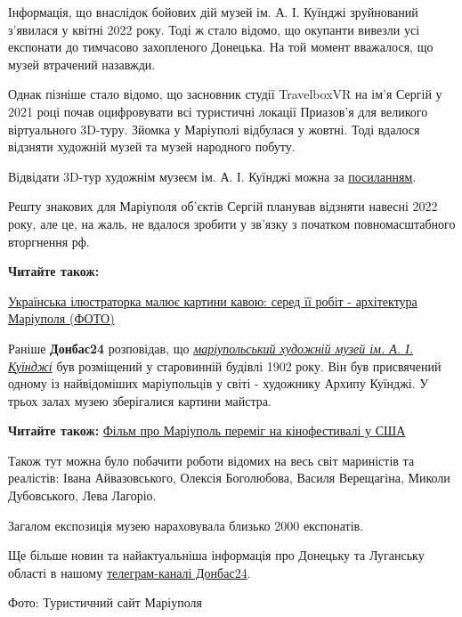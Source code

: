 Інформація, що внаслідок бойових дій музей ім. А. І. Куїнджі зруйнований
з'явилася у квітні 2022 року. Тоді ж стало відомо, що окупанти вивезли усі
експонати до тимчасово захопленого Донецька. На той момент вважалося, що музей
втрачений назавжди.


Однак пізніше стало відомо, що засновник студії TravelboxVR на ім'я Сергій у
2021 році почав оцифровувати всі туристичні локації Приазов'я для великого
віртуального 3D-туру. Зйомка у Маріуполі відбулася у жовтні. Тоді вдалося
відзняти художній музей та музей народного побуту.

Відвідати 3D-тур художнім музеєм ім. А. І. Куїнджі можна за
\href{https://mistomariupol.com.ua/uk/tours/kuyindzhi-museum}{посиланням}.


Решту знакових для Маріуполя об'єктів Сергій планував відзняти навесні 2022
року, але це, на жаль, не вдалося зробити у зв'язку з початком повномасштабного
вторгнення рф.

\textbf{Читайте також:} 

\href{https://donbas24.news/news/ukrayinska-ilyustratorka-malyuje-kartini-kavoyu-sered-yiyi-robit-arxitektura-mariupolya-foto}{Українська ілюстраторка малює картини кавою: серед її робіт - архітектура Маріуполя (ФОТО)}


Раніше \textbf{Донбас24} розповідав, що \href{https://donbas24.news/news/den-muzeyiv-yak-rosiyani-ruinuyut-kulturnu-spadshhinu-donbasu-foto}{\em маріупольський художній музей ім. А. І. Куїнджі}
був розміщений у старовинній будівлі 1902 року. Він був присвячений одному із
найвідоміших маріупольців у світі - художнику Архипу Куїнджі. У трьох залах
музею зберігалися картини майстра.


\textbf{Читайте також:} \href{https://donbas24.news/news/film-pro-mariupol-peremig-na-kinofestivali-u-ssa}{Фільм про Маріуполь переміг на кінофестивалі у США}

Також тут можна було побачити роботи відомих на весь світ мариністів та
реалістів: Івана Айвазовського, Олексія Боголюбова, Василя Верещагіна, Миколи
Дубовського, Лева Лагоріо.

Загалом експозиція музею нараховувала близько 2000 експонатів.

Ще більше новин та найактуальніша інформація про Донецьку та Луганську області
в нашому \href{https://t.me/donbas24}{телеграм-каналі Донбас24}.

Фото: Туристичний сайт Маріуполя
